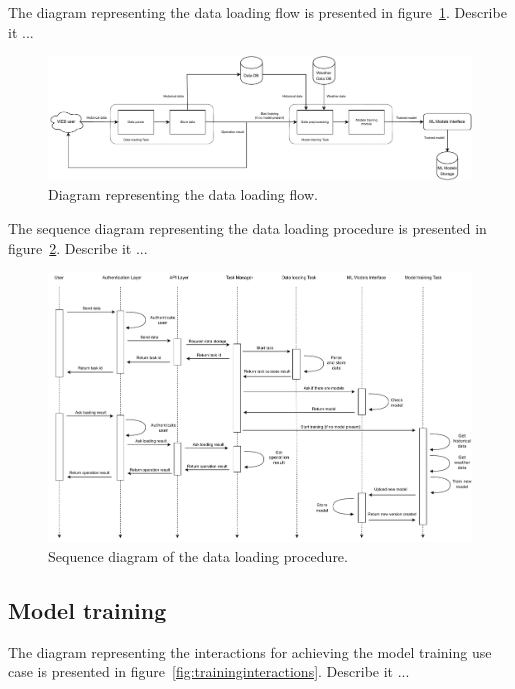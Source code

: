 The diagram representing the data loading flow is presented in figure~\ref{fig:loadingflow}.
Describe it ...

\begin{figure}[H]
\centering
\includegraphics[width=1\textwidth]{images/architecture_data_loading_flow}
\caption{Diagram representing the data loading flow.}
\label{fig:loadingflow}
\end{figure}

The sequence diagram representing the data loading procedure is presented in figure~\ref{fig:loadingsequence}.
Describe it ...

\begin{figure}[H]
\centering
\includegraphics[width=1\textwidth]{images/architecture_data_loading_sequence}
\caption{Sequence diagram of the data loading procedure.}
\label{fig:loadingsequence}
\end{figure}


\vspace{0.1 cm}
\subsection{Model training}
\label{sec:training}
\vspace{0.1 cm}

The diagram representing the interactions for achieving the model training use case is presented in figure~\ref{fig:traininginteractions}.
Describe it ...

